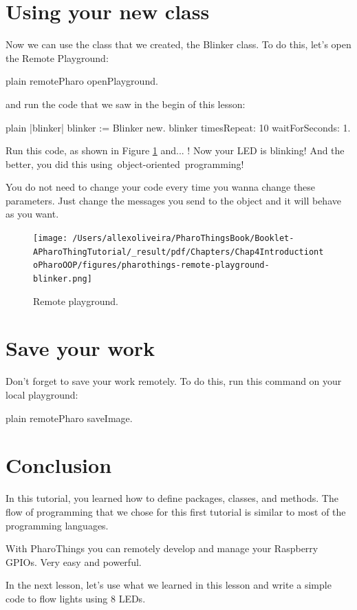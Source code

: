 \documentclass[10pt,twoside,english]{_support/latex/sbabook/sbabook}
\begin{document}
\section{Using your new class}
Now we can use the class that we created, the Blinker class. To do this, let's open the Remote Playground:

\begin{displaycode}{plain}
remotePharo openPlayground.
\end{displaycode}

and run the code that we saw in the begin of this lesson:

\begin{displaycode}{plain}
|blinker|
blinker := Blinker new. 
blinker timesRepeat: 10 waitForSeconds: 1.
\end{displaycode}

Run this code, as shown in Figure \ref{RemotePlayground} and... ! Now your LED is blinking! And the better, you did this using object-oriented programming! 

 You do not need to change your code every time you wanna change these parameters. Just change the messages you send to the object and it will behave as you want.


\begin{figure}

\begin{center}
\texttt{[image: /Users/allexoliveira/PharoThingsBook/Booklet-APharoThingTutorial/\_result/pdf/Chapters/Chap4IntroductiontoPharoOOP/figures/pharothings-remote-playground-blinker.png]}\caption{Remote playground.\label{RemotePlayground}}\end{center}
\end{figure}



\section{Save your work}
Don't forget to save your work remotely. To do this, run this command on your local playground:

\begin{displaycode}{plain}
remotePharo saveImage.
\end{displaycode}
\section{Conclusion}
In this tutorial, you learned how to define packages, classes, and methods. The flow of programming that we chose for this first tutorial is similar to most of the programming languages.

With PharoThings you can remotely develop and manage your Raspberry GPIOs. Very easy and powerful.

In the next lesson, let’s use what we learned in this lesson and write a simple code to flow lights using 8 LEDs.


\backmatter

\end{document}
